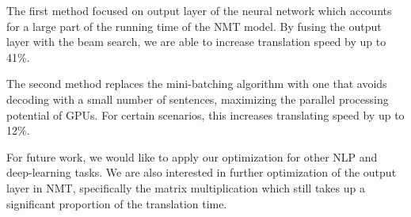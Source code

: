 \documentclass[11pt,a4paper]{article}
\begin{document}
The first method focused on output layer of the neural network which accounts for a large part of the running time of the NMT model. By fusing the output layer with the beam search, we are able to increase translation speed by up to 41\%.

The second method replaces the mini-batching algorithm with one that avoids decoding with a small number of sentences, maximizing the parallel processing potential of GPUs. For certain scenarios, this increases translating  speed by up to 12\%.

For future work, we would like to apply our optimization for other NLP and deep-learning tasks. We are also interested in further optimization of the output layer in NMT, specifically the matrix multiplication which still takes up a significant proportion of the translation time.




\end{document}
